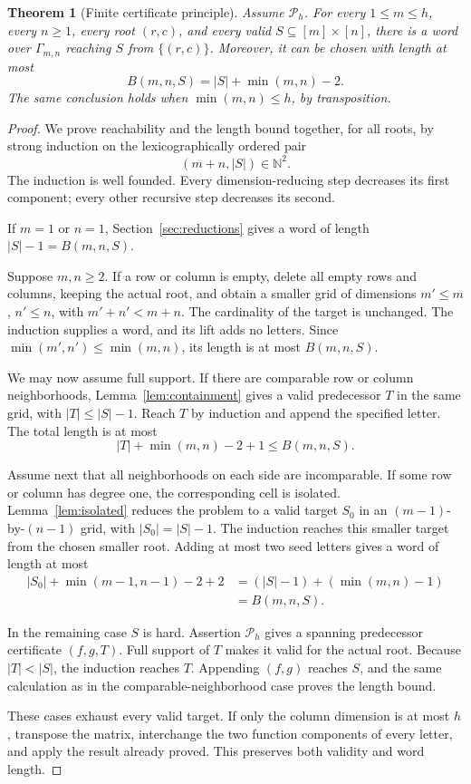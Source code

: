 \documentclass[11pt,letterpaper]{article}
\numberwithin{equation}{section}
\newtheorem{theorem}{Theorem}[section]
\theoremstyle{definition}
\theoremstyle{remark}
\begin{document}
\begin{theorem}[Finite certificate principle]\label{thm:finite-principle}
Assume $\mathcal P_h$. For every $1\le m\le h$, every $n\ge1$, every root
$(r,c)$, and every valid $S\subseteq[m]\times[n]$, there is a word over
$\Gamma_{m,n}$ reaching $S$ from $\{(r,c)\}$. Moreover, it can be chosen
with length at most
\begin{equation}\label{eq:potential}
 B(m,n,S)=|S|+\min(m,n)-2.
\end{equation}
The same conclusion holds when $\min(m,n)\le h$, by transposition.
\end{theorem}
\begin{proof}
We prove reachability and the length bound together, for all roots, by
strong induction on the lexicographically ordered pair
\[
 (m+n,|S|)\in\mathbb N^2.
\]
The induction is well founded. Every dimension-reducing step decreases
its first component; every other recursive step decreases its second.

If $m=1$ or $n=1$, Section~\ref{sec:reductions} gives a word of length
$|S|-1=B(m,n,S)$.

Suppose $m,n\ge2$. If a row or column is empty, delete all empty rows and
columns, keeping the actual root, and obtain a smaller grid of dimensions
$m'\le m$, $n'\le n$, with $m'+n'<m+n$. The cardinality of the target is
unchanged. The induction supplies a word, and its lift adds no letters.
Since $\min(m',n')\le\min(m,n)$, its length is at most $B(m,n,S)$.

We may now assume full support. If there are comparable row or column
neighborhoods, Lemma~\ref{lem:containment} gives a valid predecessor $T$ in
the same grid, with $|T|\le|S|-1$. Reach $T$ by induction and append the
specified letter. The total length is at most
\[
 |T|+\min(m,n)-2+1\le B(m,n,S).
\]

Assume next that all neighborhoods on each side are incomparable. If some
row or column has degree one, the corresponding cell is isolated.
Lemma~\ref{lem:isolated} reduces the problem to a valid target $S_0$ in
an $(m-1)$-by-$(n-1)$ grid, with $|S_0|=|S|-1$. The induction reaches
this smaller target from the chosen smaller root. Adding at most two seed
letters gives a word of length at most
\begin{align*}
 |S_0|+\min(m-1,n-1)-2+2
 &= (|S|-1)+(\min(m,n)-1)\\
 &=B(m,n,S).
\end{align*}

In the remaining case $S$ is hard. Assertion $\mathcal P_h$ gives a
spanning predecessor certificate $(f,g,T)$. Full support of $T$ makes it
valid for the actual root. Because $|T|<|S|$, the induction reaches $T$.
Appending $(f,g)$ reaches $S$, and the same calculation as in the
comparable-neighborhood case proves the length bound.

These cases exhaust every valid target. If only the column dimension is
at most $h$, transpose the matrix, interchange the two function components
of every letter, and apply the result already proved. This preserves both
validity and word length.
\end{proof}
\end{document}
